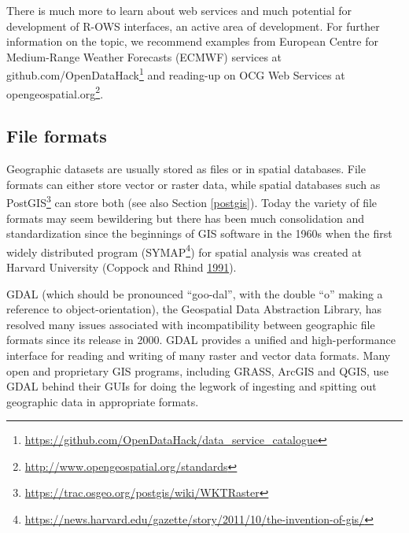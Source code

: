 \documentclass[]{krantz}
\newenvironment{Shaded}{\begin{snugshade}}{\end{snugshade}}
\newcommand{\DataTypeTok}[1]{\textcolor[rgb]{0.27,0.27,0.27}{#1}}
\newcommand{\KeywordTok}[1]{\textcolor[rgb]{0.27,0.27,0.27}{\textbf{#1}}}
\newcommand{\NormalTok}[1]{#1}
\newcommand{\OperatorTok}[1]{\textcolor[rgb]{0.43,0.43,0.43}{\textbf{#1}}}
\newcommand{\StringTok}[1]{\textcolor[rgb]{0.5,0.5,0.5}{#1}}
\let\rmarkdownfootnote\footnote%
\def\footnote{\protect\rmarkdownfootnote}
\renewcommand{\href}[2]{#2\footnote{\url{#1}}}
\begin{document}
\begin{Shaded}
\end{Shaded}

There is much more to learn about web services and much potential for development of R-OWS interfaces, an active area of development.
For further information on the topic, we recommend examples from European Centre for Medium-Range Weather Forecasts (ECMWF) services at \href{https://github.com/OpenDataHack/data_service_catalogue}{github.com/OpenDataHack} and reading-up on OCG Web Services at \href{http://www.opengeospatial.org/standards}{opengeospatial.org}.

\hypertarget{file-formats}{%
\subsection{File formats}\label{file-formats}}

Geographic datasets are usually stored as files or in spatial databases.
File formats can either store vector or raster data, while spatial databases such as \href{https://trac.osgeo.org/postgis/wiki/WKTRaster}{PostGIS} can store both (see also Section \ref{postgis}).
Today the variety of file formats may seem bewildering but there has been much consolidation and standardization since the beginnings of GIS software in the 1960s when the first widely distributed program (\href{https://news.harvard.edu/gazette/story/2011/10/the-invention-of-gis/}{SYMAP}) for spatial analysis was created at Harvard University (Coppock and Rhind \protect\hyperlink{ref-coppock_history_1991}{1991}).

GDAL (which should be pronounced ``goo-dal'', with the double ``o'' making a reference to object-orientation), the Geospatial Data Abstraction Library, has resolved many issues associated with incompatibility between geographic file formats since its release in 2000.
GDAL provides a unified and high-performance interface for reading and writing of many raster and vector data formats.
Many open and proprietary GIS programs, including GRASS, ArcGIS and QGIS, use GDAL behind their GUIs for doing the legwork of ingesting and spitting out geographic data in appropriate formats.
\end{document}
